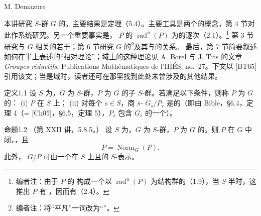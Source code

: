 \begin{center}M. Demazure\end{center}
本讲研究 $S$-群 $G$ 的。主要结果是定理（5.4）。主要工具是两个的概念，第 4 节对此作系统研究。另一个重要事实是， $P$ 的 $\operatorname{rad}^{u}(P)$ 为的逐次（2.1）。\footnote{编者注：由于 $P$ 的 构成一个以 $\operatorname{rad}^{u}(P)$ 为结构群的（1.9），当 $S$ 半时，这推出 $P$ 有 ，因而有（2.4）。}
第 3 节研究与 $G$ 相关的若干；第 6 节研究 $G$ 的\footnote{编者注：将“平凡”一词改为“”。}及其与的关系。
最后，第 7 节简要叙述如何在半上表述的“相对理论”；域上的这种理论见 A. Borel 与 J. Tits 的文章 \textit{Groupes réductifs}, Publications Mathématiques de l'IHÉS, no.~27。下文以 [BT65] 引用该文；当是域时，读者还可在那里找到此处未曾涉及的其他结果。
\begin{SGAresult}{定义}{1.1}
设 $S$ 为，$G$ 为 $S$-群，$P$ 为 $G$ 的子 $S$-群。若满足以下条件，则称 $P$ 为 $G$ 的：
(i) $P$ 在 $S$ 上；
(ii) 对每个 $s\in S$，商 $\bar s$- $G_{\bar s}/P_{\bar s}$ 是的（即由 Bible，§6.4，定理 4（= [Ch05]，§6.5，定理 5），$P_{\bar s}$ 包含 $G_{\bar s}$ 的一个）。
\end{SGAresult}
\begin{SGAresult}{命题}{1.2}
（第 XXII 讲，5.8.5。）
设 $S$ 为，$G$ 为 $S$-群，$P$ 为 $G$ 的。则 $P$ 在 $G$ 中闭，，且
\[P=\operatorname{Norm}_G(P).\]
此外， $G/P$ 可由一个在 $S$ 上且的 $S$-表示。
\end{SGAresult}
